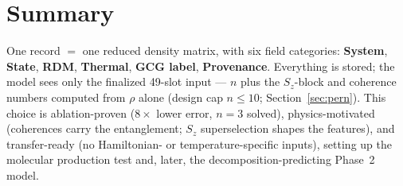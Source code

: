 \documentclass[11pt]{article}
\begin{document}
\section{Summary}
One record $=$ one reduced density matrix, with six field categories:
\textbf{System}, \textbf{State}, \textbf{RDM}, \textbf{Thermal},
\textbf{GCG label}, \textbf{Provenance}. Everything is stored; the model sees
only the finalized 49-slot input --- $n$ plus the $S_z$-block and coherence
numbers computed from $\rho$ alone (design cap $n\le10$;
Section~\ref{sec:pern}). This choice is ablation-proven
($8\times$ lower error, $n{=}3$ solved), physics-motivated (coherences carry
the entanglement; $S_z$ superselection shapes the features), and
transfer-ready (no Hamiltonian- or temperature-specific inputs), setting up
the molecular production test and, later, the decomposition-predicting
Phase~2 model.
\end{document}
